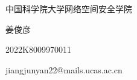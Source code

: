 \documentclass[11pt]{article}
\makeatletter
\newcommand{\Institution}{中国科学院大学网络空间安全学院}
\newcommand{\className}{}
\newcommand{\documentType}{}
\newcommand{\studentName}{姜俊彦}
\newcommand{\studentNumber}{2022K8009970011}
\newcommand{\studentEmail}{jiangjunyan22@mails.ucas.ac.cn}
\makeatother
\begin{document}
\begin{center}
	\huge \Institution

	\className

	\LARGE \documentType

	\large \kaishu

  \studentName

  \studentNumber

  \studentEmail


\end{center}

\tableofcontents
 
\newpage


\end{document}
